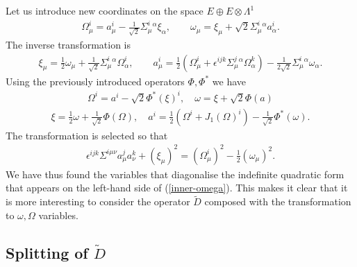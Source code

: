 \documentclass[10pt]{report}
\theoremstyle{definition}
\begin{document}
Let us introduce new coordinates on the space $E\oplus E\otimes\Lambda^1$
\begin{align}
\Omega_\mu^i = a_\mu^i - \frac{1}{\sqrt{2}} \Sigma^i_\mu{}^\alpha \xi_\alpha, \qquad \omega_\mu = \xi_\mu + \sqrt{2} \Sigma^i_\mu{}^\alpha a_\alpha^i.
\end{align}
The inverse transformation is
\begin{align}
\xi_\mu = \frac{1}{2}\omega_\mu + \frac{1}{\sqrt{2}} \Sigma_\mu^i{}^\alpha \Omega^i_\alpha, \qquad a_\mu^i = \frac{1}{2}( \Omega_\mu^i + \epsilon^{ijk}\Sigma^j_\mu{}^\alpha \Omega_\alpha^k) - \frac{1}{2\sqrt{2}} \Sigma^i_\mu{}^\alpha \omega_\alpha.
\end{align}
Using the previously introduced operators $\Phi,\Phi^*$ we have
\begin{align}
\Omega^i = a^i - \sqrt{2} \Phi^*(\xi)^i, \quad \omega = \xi + \sqrt{2} \Phi(a)
\end{align}
\begin{align}
\xi = \frac{1}{2}\omega + \frac{1}{\sqrt{2}} \Phi(\Omega), \quad a^i = \frac{1}{2}(\Omega^i + J_1(\Omega)^i) - \frac{1}{\sqrt{2}} \Phi^*(\omega).
\end{align}
The transformation is selected so that
\begin{align}\label{inner-omega}
\epsilon^{ijk} \Sigma^{i\mu\nu} a_\mu^j a_\nu^k + (\xi_\mu)^2 = (\Omega_\mu^i)^2 - \frac{1}{2} (\omega_\mu)^2. 
\end{align}
We have thus found the variables that diagonalise the indefinite quadratic form that appears on the left-hand side of (\ref{inner-omega}). This makes it clear that it is more interesting to consider the operator $\tilde{D}$ composed with the transformation to $\omega, \Omega$ variables. 

\subsection{\texorpdfstring{Splitting of $\tilde{D}$}{}}
\end{document}

